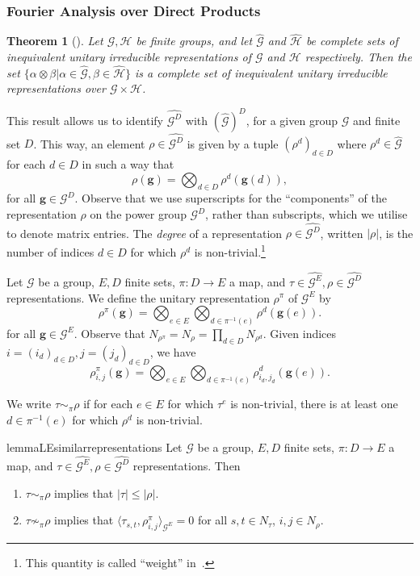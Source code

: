 \documentclass[a4paper,11pt]{article}
\newtheorem{theorem}{Theorem}[section]
\theoremstyle{definition}
\newcommand{\gr}{\mathscr{G}}
\newcommand{\sgr}{\mathscr{H}}
\newcommand{\bg}{\mathbf{g}}
\begin{document}
\subsubsection{Fourier Analysis over Direct Products}


\begin{theorem}[\cite{Terras_1999}]
    Let $\gr,\sgr$ be finite groups,
    and let $\widehat{\gr}$ and $\widehat{\sgr}$ be complete sets of inequivalent unitary irreducible representations of $\gr$ and $\sgr$ respectively. Then the set
    $\{
    \alpha \otimes \beta \vert \alpha\in \widehat{\gr}, \beta\in  \widehat{\sgr}
    \}$ is a complete set of inequivalent unitary irreducible representations over $\gr\times \sgr$.
\end{theorem}
This result allows us to identify $\widehat{\gr^D}$ with $(\widehat{\gr})^D$, for a given group $\gr$ and finite set $D$. This way, an element $\rho\in \widehat{\gr^D}$ is given by a tuple $(\rho^d)_{d\in D}$ where $\rho^d\in \widehat{\gr}$ for each $d\in D$ in such a way that
\[
\rho(\bg)= \bigotimes_{d\in D}
\rho^d(\bg(d)),
\]
for all $\bg \in \gr^D$. Observe that we use superscripts for the ``components'' of the representation $\rho$ on the power group $\gr^D$, rather than subscripts, which we utilise to denote matrix entries. 
The \emph{degree} of a representation $\rho\in \widehat{\gr^D}$, written $|\rho|$, is the number of indices $d\in D$ for
which $\rho^d$ is non-trivial.\footnote{This quantity is called ``weight''
in~\cite{EHR04:tcs,Bhangale23:algorithmica}.} \par
Let $\gr$ be a group, $E, D$ finite sets, $\pi: D\rightarrow E$ a map, and $\tau\in \widehat{\gr^E}, \rho\in \widehat{\gr^D}$ representations. We define the unitary representation $\rho^\pi$
of $\gr^E$ by 
\[\rho^\pi( \bg)=  
\bigotimes_{e\in E}
\bigotimes_{d\in \pi^{-1}(e)}
\rho^{d}(\bg(e)).
\] for all $\bg \in \gr^E$.
Observe that $N_{\rho^\pi}=N_\rho= \prod_{d\in D} N_{\rho^d}$. Given indices $i=(i_d)_{d\in D}, j=(j_d)_{d\in D}$, we have 
\[\rho_{i,j}^\pi( \bg)=  
\bigotimes_{e\in E}
\bigotimes_{d\in \pi^{-1}(e)}
\rho_{i_d,j_d}^{d}(\bg(e)).
\] 

We write $\tau \sim_\pi \rho$ if for each $e\in E$ for which $\tau^e$ is non-trivial, there is at least one $d\in \pi^{-1}(e)$ for which $\rho^d$ is non-trivial. 

\begin{restatable}{lemma}{LEsimilarrepresentations}
\label{le:similar_representations}
    Let $\gr$ be a group, $E, D$ finite sets, $\pi: D\rightarrow E$ a map, and $\tau\in \widehat{\gr^E}, \rho\in \widehat{\gr^D}$ representations. Then 
    \begin{enumerate}
        \item $\tau \sim_\pi \rho$ implies that $|\tau| \leq |\rho|$.
        \item $\tau \not\sim_\pi \rho$ implies that 
        $\langle \tau_{s,t}, \rho^\pi_{i,j} \rangle_{\gr^E}=0$
        for all $s,t\in N_\tau$, $i,j\in N_\rho$.
    \end{enumerate}
\end{restatable}
\end{document}
